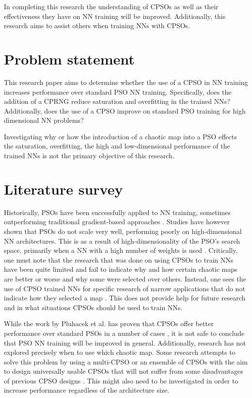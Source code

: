 \documentclass[conference]{IEEEtran}
\begin{document}
In completing this research the understanding of \ac{CPSO}s as well as their effectiveness they have on \ac{NN} training will be improved. Additionally, this research aims to assist others when training \ac{NN}s with \ac{CPSO}s.

\section{Problem statement}
This research paper aims to determine whether the use of a \ac{CPSO} in \ac{NN} training increases performance over standard \ac{PSO} \ac{NN} training. Specifically, does the addition of a \ac{CPRNG} reduce saturation and overfitting in the trained \ac{NN}s? Additionally, does the use of a \ac{CPSO} improve on standard \ac{PSO} training for high dimensional \ac{NN} problems?

Investigating why or how the introduction of a chaotic map into a \ac{PSO} effects the saturation, overfitting, the high and low-dimensional performance of the trained \ac{NN}s is not the primary objective of this research.

\section{Literature survey}
Historically, \ac{PSO}s have been successfully applied to \ac{NN} training, sometimes outperforming traditional gradient-based approaches \cite{anna:saturation-psonn}\cite{anna:meas-sat-nn}. Studies have however shown that \ac{PSO}s do not scale very well, performing poorly on high-dimensional \ac{NN} architectures. This is as a result of high-dimensionality of the \ac{PSO}'s search space, primarily when a \ac{NN} with a high number of weights is used \cite{anna:saturation-psonn}. Critically, one must note that the research that was done on using \ac{CPSO}s to train \ac{NN}s have been quite limited and fail to indicate why and how certain chaotic maps are better or worse and why some were selected over others. Instead, one sees the use of \ac{CPSO} trained \ac{NN}s for specific research of narrow applications that do not indicate how they selected a map \cite{song:cpsonn}. This does not provide help for future research and in what situations \ac{CPSO}s should be used to train \ac{NN}s.

While the work by Pluhacek et al. has proven that \ac{CPSO}s offer better performance over standard \ac{PSO}s in a number of cases \cite{pluhacek:cpso-cprng-imp}\cite{pluhacek:ms-cpso}\cite{pluhacek:cpso-esb-chaotic}, it is not safe to conclude that \ac{PSO} \ac{NN} training will be improved in general. Additionally, research has not explored precisely when to use which chaotic map. Some research \cite{pluhacek:cpso-esb-chaotic}\cite{pluhacek:ms-cpso} attempts to solve this problem by using a multi-\ac{CPSO} or an ensemble of \ac{CPSO}s with the aim to design universally usable \ac{CPSO}s that will not suffer from some disadvantages of previous \ac{CPSO} designs \cite{pluhacek:pso-mutichaotic-ng}. This might also need to be investigated in order to increase performance regardless of the architecture size.
\end{document}
